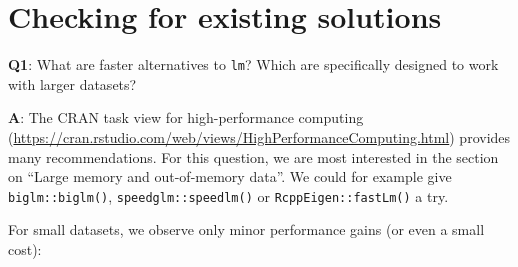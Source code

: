\documentclass[
]{krantz}
\renewcommand{\href}[2]{#2 (\url{#1})}
\begin{document}
\addtocounter{section}{2}

\hypertarget{checking-for-existing-solutions}{%
\section{Checking for existing solutions}\label{checking-for-existing-solutions}}

\textbf{{Q1}}: What are faster alternatives to \texttt{lm}? Which are specifically designed to work with larger datasets?

\textbf{{A}}: The \href{https://cran.rstudio.com/web/views/HighPerformanceComputing.html}{CRAN task view for high-performance computing} provides many recommendations. For this question, we are most interested in the section on ``Large memory and out-of-memory data''. We could for example give \texttt{biglm::biglm()}, \texttt{speedglm::speedlm()} or \texttt{RcppEigen::fastLm()} a try.

For small datasets, we observe only minor performance gains (or even a small cost):
\end{document}
